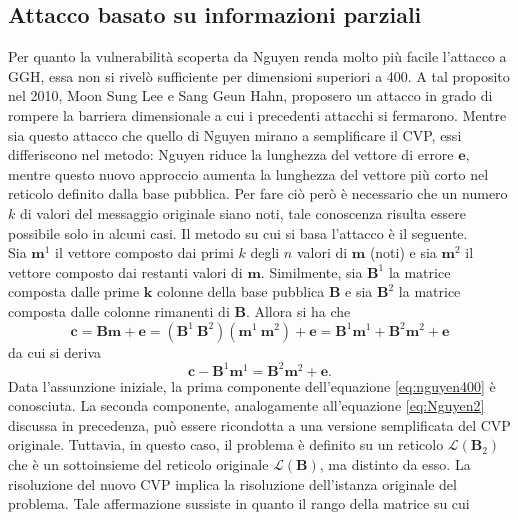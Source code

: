 \subsection{Attacco basato su informazioni parziali}
Per quanto la vulnerabilità scoperta da Nguyen renda molto più facile l'attacco a GGH, essa
non si rivelò sufficiente per dimensioni superiori a 400. A tal proposito nel 2010, Moon Sung Lee 
e Sang Geun Hahn\cite{Nguyen400}, proposero un attacco in grado di rompere la barriera 
dimensionale a cui i precedenti attacchi si fermarono. Mentre sia questo attacco che quello 
di Nguyen mirano a semplificare il CVP, essi differiscono nel metodo: 
Nguyen riduce la lunghezza del vettore di errore $\mathbf{e}$, mentre questo nuovo approccio 
aumenta la lunghezza del vettore più corto nel reticolo definito dalla base pubblica.
Per fare ciò però è necessario che un numero $k$ di valori del messaggio originale siano noti,
tale conoscenza risulta essere possibile solo in alcuni casi. Il metodo su cui si basa
l'attacco è il seguente.\\
Sia $\mathbf{m}^1$ il vettore composto dai primi $k$ degli $n$ valori di $\mathbf{m}$ (noti) e
sia $\mathbf{m}^2$ il vettore composto dai restanti valori di $\mathbf{m}$. Similmente, sia 
$\mathbf{B}^1$ la matrice composta dalle prime $\mathbf{k}$ colonne della base
pubblica $\mathbf{B}$ e sia $\mathbf{B}^2$ la matrice composta dalle colonne rimanenti di
$\mathbf{B}$.  Allora si ha che
\begin{equation*}
    \mathbf{c} = \mathbf{B}\mathbf{m} + \mathbf{e} =
    (\mathbf{B}^1 \ \mathbf{B}^2) (\mathbf{m}^1 \ \mathbf{m}^2) + \mathbf{e}
    = \mathbf{B}^1\mathbf{m}^1 + \mathbf{B}^2\mathbf{m}^2 + \mathbf{e}
\end{equation*}
da cui si deriva
\begin{equation}
    \label{eq:nguyen400}
    \mathbf{c} - \mathbf{B}^1\mathbf{m}^1 = \mathbf{B}^2\mathbf{m}^2 + \mathbf{e}.
\end{equation}
Data l'assunzione iniziale, la prima componente dell'equazione \ref{eq:nguyen400} è conosciuta. 
La seconda componente, analogamente all'equazione \ref{eq:Nguyen2} discussa in precedenza, 
può essere ricondotta a una versione semplificata del CVP originale. 
Tuttavia, in questo caso, il problema è definito su un reticolo $\mathcal{L}(\mathbf{B}_2)$ 
che è un sottoinsieme del reticolo originale $\mathcal{L}(\mathbf{B})$, ma distinto da esso. 
La risoluzione del nuovo CVP implica la risoluzione dell'istanza 
originale del problema. Tale affermazione sussiste in quanto il rango della matrice su cui
